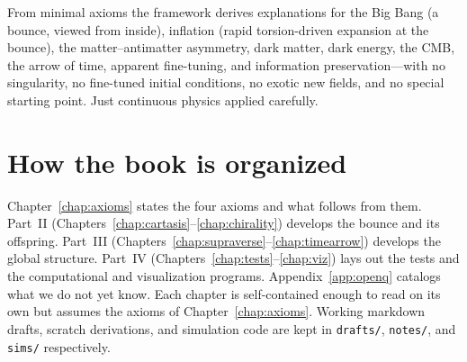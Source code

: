From minimal axioms the framework derives explanations for the Big Bang (a
bounce, viewed from inside), inflation (rapid torsion-driven expansion at the
bounce), the matter--antimatter asymmetry, dark matter, dark energy, the CMB,
the arrow of time, apparent fine-tuning, and information preservation---with no
singularity, no fine-tuned initial conditions, no exotic new fields, and no
special starting point. Just continuous physics applied carefully.

\section*{How the book is organized}

Chapter~\ref{chap:axioms} states the four axioms and what follows from them.
Part~II (Chapters~\ref{chap:cartasis}--\ref{chap:chirality}) develops the bounce
and its offspring. Part~III
(Chapters~\ref{chap:supraverse}--\ref{chap:timearrow}) develops the global
structure. Part~IV (Chapters~\ref{chap:tests}--\ref{chap:viz}) lays out the
tests and the computational and visualization programs.
Appendix~\ref{app:openq} catalogs what we do not yet know. Each chapter is
self-contained enough to read on its own but assumes the axioms of
Chapter~\ref{chap:axioms}. Working markdown drafts, scratch derivations, and
simulation code are kept in \texttt{drafts/}, \texttt{notes/}, and
\texttt{sims/} respectively.
